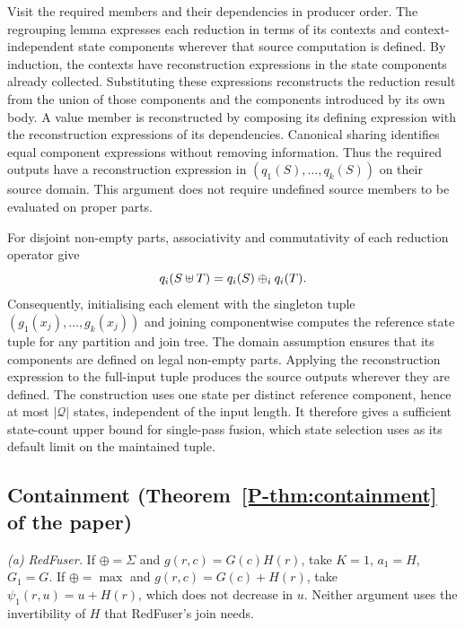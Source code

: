 \documentclass[acmsmall,screen,review,anonymous,nonacm]{acmart}
\newcommand{\pref}[1]{\ref{P-#1} of the paper}
\begin{document}
Visit the required members and their dependencies in producer order.
The regrouping lemma expresses each reduction in terms of its contexts and context-independent state components wherever that source computation is defined.
By induction, the contexts have reconstruction expressions in the state components already collected.
Substituting these expressions reconstructs the reduction result from the union of those components and the components introduced by its own body.
A value member is reconstructed by composing its defining expression with the reconstruction expressions of its dependencies.
Canonical sharing identifies equal component expressions without removing information.
Thus the required outputs have a reconstruction expression in $(q_1(S),\dots,q_k(S))$ on their source domain.
This argument does not require undefined source members to be evaluated on proper parts.

For disjoint non-empty parts, associativity and commutativity of each reduction operator give
\[
q_i(S\uplus T)=q_i(S)\oplus_i q_i(T).
\]
Consequently, initialising each element with the singleton tuple $(g_1(x_j),\dots,g_k(x_j))$ and joining componentwise computes the reference state tuple for any partition and join tree.
The domain assumption ensures that its components are defined on legal non-empty parts.
Applying the reconstruction expression to the full-input tuple produces the source outputs wherever they are defined.
The construction uses one state per distinct reference component, hence at most $|\mathcal Q|$ states, independent of the input length.
It therefore gives a sufficient state-count upper bound for single-pass fusion, which state selection uses as its default limit on the maintained tuple.

\subsection{Containment (Theorem~\pref{thm:containment})}

\emph{(a) RedFuser.}
If $\oplus=\Sigma$ and $g(r,c)=G(c)H(r)$, take $K=1$, $a_1=H$, $G_1=G$.
If $\oplus=\max$ and $g(r,c)=G(c)+H(r)$, take $\psi_1(r,u)=u+H(r)$, which does not decrease in $u$.
Neither argument uses the invertibility of $H$ that RedFuser's join needs.
\end{document}
